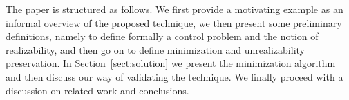 The paper is structured as follows. We first provide a motivating example as an informal overview of the proposed technique, we then present some preliminary definitions, namely to define formally a control problem and the notion of realizability, and then go on to define minimization and unrealizability preservation. In Section~\ref{sect:solution} we present the minimization algorithm and then discuss our way of validating the technique. We finally proceed with a discussion on related work and conclusions.
%
%
%
%
%
%
